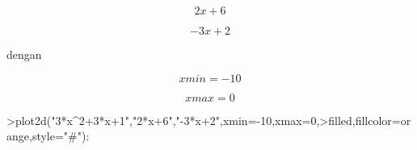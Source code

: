 \documentclass{article}
\begin{document}
\begin{eulernotebook}
\begin{eulerformula}
\[
2x+6
\]
\end{eulerformula}
\begin{eulerformula}
\[
-3x+2
\]
\end{eulerformula}
\begin{eulercomment}
dengan\\
\end{eulercomment}
\begin{eulerformula}
\[
xmin= -10
\]
\end{eulerformula}
\begin{eulerformula}
\[
xmax= 0
\]
\end{eulerformula}
\begin{eulerprompt}
>plot2d("3*x^2+3*x+1","2*x+6","-3*x+2",xmin=-10,xmax=0,>filled,fillcolor=orange,style="#"):
\end{eulerprompt}
\end{eulernotebook}
\end{document}

